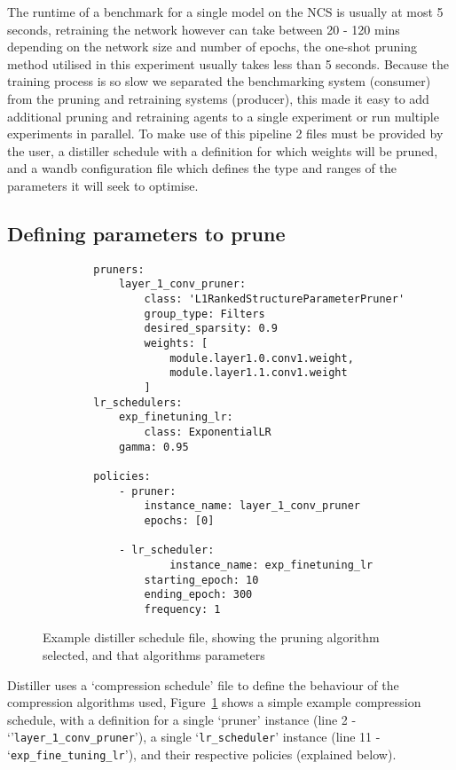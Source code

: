 \documentclass[../Dissertation.tex]{subfiles}
\begin{document}
The runtime of a benchmark for a single model on the NCS is usually at most 5 seconds, retraining the network however can take between 20 - 120 mins depending on the network size and number of epochs, the one-shot pruning method utilised in this experiment usually takes less than 5 seconds. 
Because the training process is so slow we separated the benchmarking system (consumer) from the pruning and retraining systems (producer), this made it easy to add additional pruning and retraining agents to a single experiment or run multiple experiments in parallel.
To make use of this pipeline 2 files must be provided by the user, a distiller schedule with a definition for which weights will be pruned, and a \acrshort{wandb} configuration file which defines the type and ranges of the parameters it will seek to optimise.

\subsection{Defining parameters to prune}\label{sec:paramDef}

\singlespacing
\begin{figure}[H]
    \begin{verbatim}
        pruners: 
            layer_1_conv_pruner:
                class: 'L1RankedStructureParameterPruner'
                group_type: Filters
                desired_sparsity: 0.9
                weights: [
                    module.layer1.0.conv1.weight,
                    module.layer1.1.conv1.weight
                ]
        lr_schedulers:
            exp_finetuning_lr:
                class: ExponentialLR
            gamma: 0.95

        policies:
            - pruner:
                instance_name: layer_1_conv_pruner
                epochs: [0]
            
            - lr_scheduler:
                    instance_name: exp_finetuning_lr
                starting_epoch: 10
                ending_epoch: 300
                frequency: 1
    \end{verbatim}
    \caption{Example distiller schedule file, showing the pruning algorithm selected, and that algorithms parameters}
    \label{fig:CompressionSchedule}
\end{figure}
\doublespacing

Distiller uses a `compression schedule' file to define the behaviour of the compression algorithms used, Figure~\ref{fig:CompressionSchedule} shows a simple example compression schedule, with a definition for a single `pruner' instance (line 2 - `'\texttt{\color{mintedgreen}layer\_1\_conv\_pruner}'), a single `\texttt{\color{mintedgreen}lr\_scheduler}' instance (line 11 - `\texttt{\color{mintedgreen}exp\_fine\_tuning\_lr}'), and their respective policies (explained below).
\end{document}
